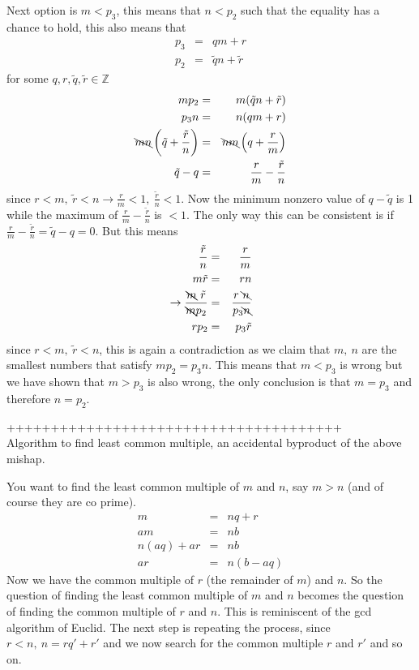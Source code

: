 \documentclass[aps,preprint,preprintnumbers,nofootinbib,showpacs,prd]{revtex4-1}
\newcommand{\nbea}{\begin{eqnarray*}}
\newcommand{\neea}{\end{eqnarray*}}
\begin{document}
Next option is $m < p_3$, this means that $n < p_2$ such that the equality has a chance to hold, this also means that
%
\nbea
p_3 & = & q m + r \\
p_2 & = & \tilde q n + \tilde r
\neea
%
for some $q,r,\tilde q, \tilde r \in \mathbb{Z}$
%
\nbea
m p_2 & = & m (\tilde q n + \tilde r) \\
p_3 n & = & n (q m + r) \\
\bcancel{mn} \left (\tilde q + \frac{\tilde r}{n} \right ) & = &\bcancel{nm} \left (q + \frac{ r}{m} \right ) \\
\tilde q - q & = & \frac{ r}{m} - \frac{\tilde r}{n}
\neea
%
since $r < m, ~ \tilde r < n \to \frac{r}{m} < 1, ~ \frac{\tilde r}{n} < 1$. Now the minimum nonzero value of $q - \tilde q$ is 1 while the maximum of $\frac{r}{m} - \frac{\tilde r}{n}$ is $< 1$. The only way this can be consistent is if $\frac{ r}{m} - \frac{\tilde r}{n} = \tilde q - q = 0$. But this means
%
\nbea
\frac{\tilde r}{n} & = & \frac{r}{m} \\
m \tilde r & = & r n \\
\to \frac{\bcancel{m}~ \tilde r}{\bcancel{m} p_2} & = & \frac {r ~\bcancel{n}}{p_3 \bcancel{n}} \\
r p_2 & = & p_3 \tilde r
\neea
%
since $r < m, ~\tilde r < n$, this is again a contradiction as we claim that $m,~n$ are the smallest numbers that satisfy $m p_2 = p_3 n$. This means that $m < p_3$ is wrong but we have shown that $m > p_3$ is also wrong, the only conclusion is that $m = p_3$ and therefore $n = p_2$.

++++++++++++++++++++++++++++++++++++++ \\

Algorithm to find least common multiple, an accidental byproduct of the above mishap.

You want to find the least common multiple of $m$ and $n$, say $m > n$ (and of course they are co prime).
%
\nbea
m & = & nq + r \\
a m & = & n b \\
n (aq) + ar & = & nb \\
ar & = & n (b - aq)
\neea
%
Now we have the common multiple of $r$ (the remainder of $m$) and $n$. So the question of finding the least common multiple of $m$ and $n$ becomes the question of finding the common multiple of $r$ and $n$. This is reminiscent of the gcd algorithm of Euclid. The next step is repeating the process, since $r < n, ~ n = rq' + r'$ and we now search for the common multiple $r$ and $r'$ and so on.
\end{document}
